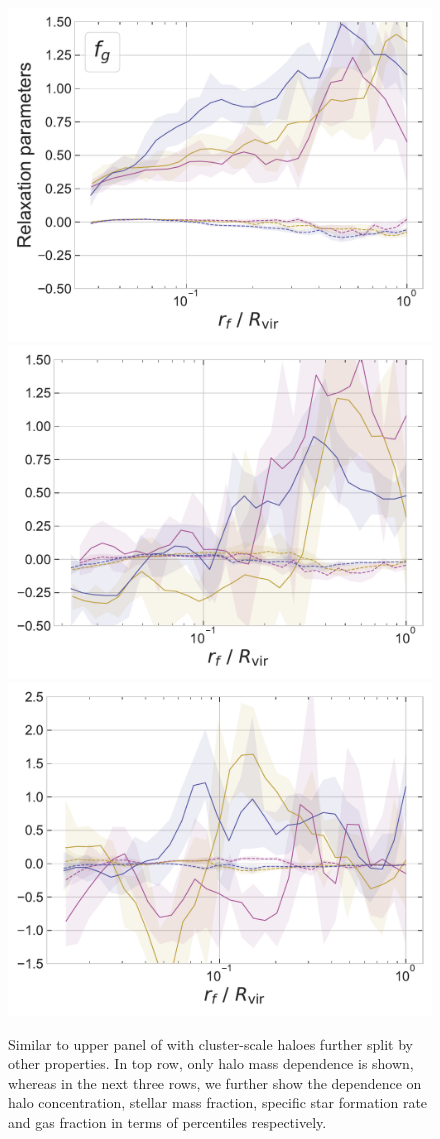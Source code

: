 \begin{figure}
    \includegraphics[width=0.32\linewidth]{plots/fit_params_rf_M-fg_T_13.pdf}
    \includegraphics[width=0.32\linewidth]{plots/fit_params_rf_M-fg_T_13.5.pdf}
    \includegraphics[width=0.32\linewidth]{plots/fit_params_rf_M-fg_T_14.pdf}
    
    \caption{Similar to upper panel of  with cluster-scale haloes further split by other properties. In top row, only halo mass dependence is shown, whereas in the next three rows, we further show the dependence on halo concentration, stellar mass fraction, specific star formation rate and gas fraction in terms of percentiles respectively.} 
    \label{fig:fit-func-rf-13514-ch:z0main}
\end{figure}

